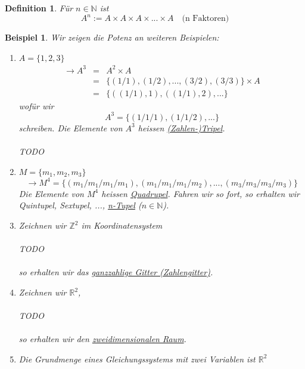 \documentclass{report}
\newtheorem{mydef}{Definition}
\newtheorem{myexample}{Beispiel}
\begin{document}
\begin{mydef}Für $n \in \mathbb{N}$ ist
\begin{equation}A^n := A \times A \times A \times ... \times A \quad \mbox{(n Faktoren)}\end{equation}\end{mydef}
\begin{myexample}Wir zeigen die Potenz an weiteren Beispielen:
\begin{enumerate}
\item $A = \{1, 2, 3\}$
\begin{eqnarray}\to A^3 & = &  A^2 \times A\\ \nonumber
& = & \{(1/1), (1/2), ..., (3/2), (3/3)\} \times A\\ \nonumber
& = & \{((1/1),1), ((1/1),2), ...\}\end{eqnarray}
wofür wir
\begin{equation}A^3 = \{(1/1/1), (1/1/2), ...\}\end{equation}
schreiben. Die Elemente von $A^3$ heissen \underline{(Zahlen-)Tripel}.
\\\\TODO
\item $M = \{m_1, m_2, m_3\}$
\begin{equation}\to M^4 = \{(m_1/m_1/m_1/m_1), (m_1/m_1/m_1/m_2), ..., (m_3/m_3/m_3/m_3)\}\end{equation}
Die Elemente von $M^4$ heissen \underline{Quadrupel}. Fahren wir so fort, so erhalten wir Quintupel, Sextupel, ..., \underline{n-Tupel} ($n \in \mathbb{N}$).
\item Zeichnen wir $\mathbb{Z}^2$ im Koordinatensystem
\\\\TODO\\\\
so erhalten wir das \underline{ganzzahlige Gitter (Zahlengitter)}.
\item Zeichnen wir $\mathbb{R}^2$,
\\\\TODO\\\\
so erhalten wir den \underline{zweidimensionalen Raum}.
\item Die Grundmenge eines Gleichungssystems mit zwei Variablen ist $\mathbb{R}^2$
\end{enumerate}
\end{myexample}
\end{document}
